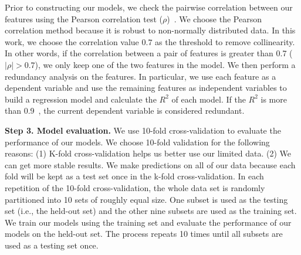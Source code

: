 Prior to constructing our models, we check the pairwise correlation between our features using the Pearson correlation test (\(\rho\))~\cite{benesty2009pearson}. We choose the Pearson correlation method because it is robust to non-normally distributed data. In this work, we choose the correlation value $0.7$ as the threshold to remove collinearity. In other words, if the correlation between a pair of features is greater than 0.7 (\(|\rho|>0.7\)), we only keep one of the two features in the model.
We then perform a redundancy analysis on the features. In particular, we use each feature as a dependent variable and use the remaining features as independent variables to build a regression model and calculate the $R^2$ of each model. If the $R^2$ is more than 0.9~\cite{markASE}, the current dependent variable is considered redundant. 

\noindent\textbf{Step 3. Model evaluation.}
We use 10-fold cross-validation to evaluate the performance of our models. %
We choose 10-fold validation for the following reasons: 
(1) K-fold cross-validation helps us better use our limited data. 
(2) We can get more stable results. We make predictions on all of our data because each fold will be kept as a test set once in the k-fold cross-validation.
In each repetition of the 10-fold cross-validation, the whole data set is randomly partitioned into 10 sets of roughly equal size. One subset is used as the testing set (i.e., the held-out set) and the other nine subsets are used as the training set. 
We train our models using the training set and evaluate the performance of our models on the held-out set.
The process repeats 10 times until all subsets are used as a testing set once.

